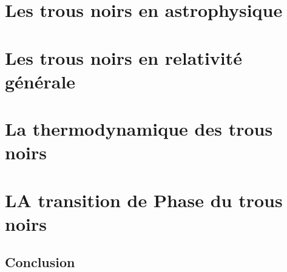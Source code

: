 \documentclass[12pt,  a4paper, openright]{report} %
\begin{document}


\newpage



\tableofcontents



	\chapter{Les trous noirs en astrophysique}

	\chapter{Les trous noirs en relativité générale}


	\chapter{La thermodynamique des trous noirs}


	\chapter{LA transition de Phase du trous noirs}



\newpage
\section*{Conclusion}


 
\end{document}
